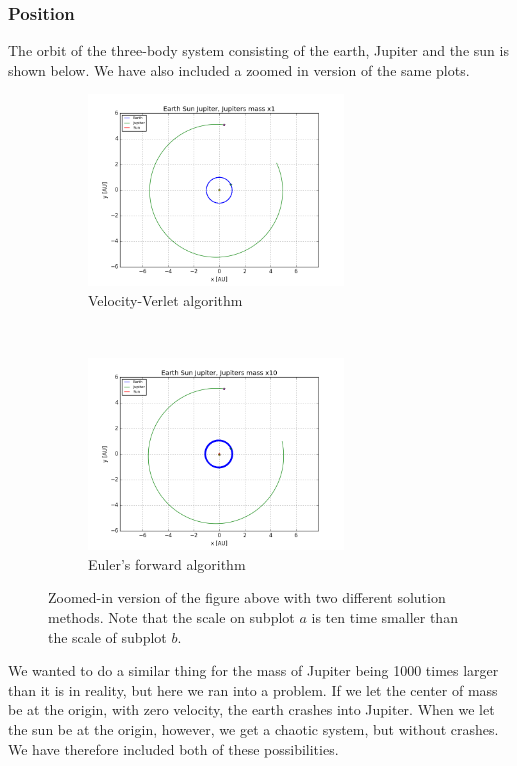 \documentclass[a4paper, 10pt]{article}
\begin{document}
\subsubsection{Position}
The orbit of the three-body system consisting of the earth, Jupiter and the sun is shown below. We have also included a zoomed in version of the same plots.
\begin{figure}[t!]
    \centering
    \begin{subfigure}[t]{0.5\textwidth}
        \centering
        \includegraphics[height=2.0in]{orbitESJ1.png}
        \caption{Velocity-Verlet algorithm}
    \end{subfigure}%
    ~ 
    \begin{subfigure}[t]{0.5\textwidth}
        \centering
        \includegraphics[height=2.0in]{orbitESJ10.png}
        \caption{Euler's forward algorithm}
    \end{subfigure}
    \caption{Zoomed-in version of the figure above with two different solution methods. Note that the scale on subplot $a$ is ten time smaller than the scale of subplot $b$.}
\end{figure}
We wanted to do a similar thing for the mass of Jupiter being 1000 times larger than it is in reality, but here we ran into a problem. If we let the center of mass be at the origin, with zero velocity, the earth crashes into Jupiter. When we let the sun be at the origin, however, we get a chaotic system, but without crashes. We have therefore included both of these possibilities.
\end{document}

